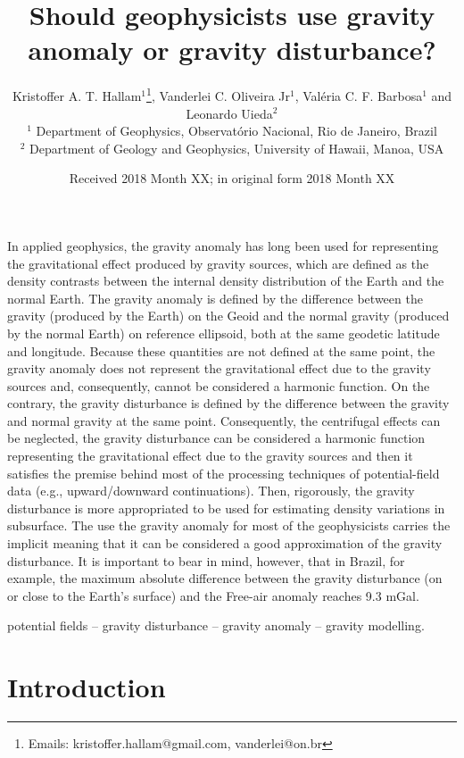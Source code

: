\documentclass[extra]{gji}
\title[Gravity anomaly or gravity disturbance?]
      {Should geophysicists use gravity anomaly or gravity disturbance?}
\author[Hallam et al.]
{Kristoffer A. T. Hallam$^{1}$\thanks{Emails: kristoffer.hallam@gmail.com,
vanderlei@on.br}, Vanderlei C. Oliveira Jr$^1$,
Val\'{e}ria C. F. Barbosa$^1$ \linebreak and Leonardo Uieda$^2$ \\
$^1$ Department of Geophysics, Observat\'{o}rio Nacional, Rio de Janeiro, Brazil \\
$^2$ Department of Geology and Geophysics, University of Hawaii, Manoa, USA
}
\date{Received 2018 Month XX; in original form 2018 Month XX}
\begin{document}
\label{firstpage}

\maketitle


\begin{summary}
 In applied geophysics, the gravity anomaly has long been used for representing the
 gravitational effect produced by gravity sources, which are defined as the density
 contrasts between the internal density distribution of the Earth and the normal Earth.
 The gravity anomaly is defined by the difference between the gravity (produced by the
 Earth) on the Geoid and the normal gravity (produced by the normal Earth)
 on reference ellipsoid, both at the same geodetic latitude and longitude.
 Because these quantities are not defined at the same point, 
 the gravity anomaly does not represent the gravitational effect due to the gravity
 sources and, consequently, cannot be considered a harmonic function.
 On the contrary, the gravity disturbance is defined by the difference between
 the gravity and normal gravity at the same point. Consequently, the centrifugal 
 effects can be neglected, the gravity disturbance can be considered a harmonic 
 function representing the gravitational effect due to the gravity sources and then 
 it satisfies the premise behind most of the processing techniques of potential-field
 data (e.g., upward/downward continuations). Then, rigorously, the gravity disturbance
 is  more appropriated to be used for estimating density variations in subsurface.
 The use the gravity anomaly for most of the geophysicists carries the
 implicit meaning that it can be considered a good approximation of the gravity
 disturbance. It is important to bear in mind, however, that in Brazil, for example, 
 the maximum absolute difference between the gravity disturbance (on or close 
 to the Earth’s surface) and the Free-air anomaly reaches 9.3 mGal.

\end{summary}

\begin{keywords}
 potential fields -- gravity disturbance -- gravity anomaly -- gravity modelling.
\end{keywords}


\section{Introduction}
\end{document}
